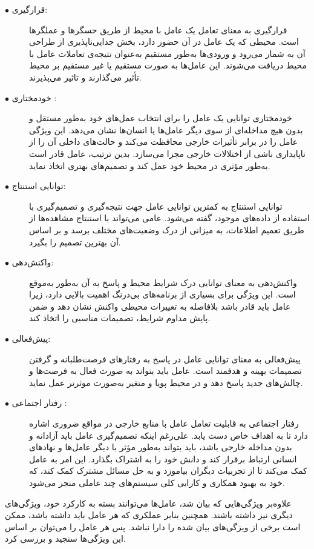 \begin{description}
	\item[$\bullet$ قرارگیری\footnotemark:] 
	قرارگیری به معنای تعامل یک عامل با محیط از طریق حسگرها و عملگرها است. محیطی که یک عامل در آن حضور دارد، بخش جدایی‌ناپذیری از طراحی آن به شمار می‌رود و ورودی‌ها به‌طور مستقیم به‌عنوان نتیجه‌ی تعاملات عامل با محیط دریافت می‌شوند. این عامل‌ها به صورت مستقیم یا غیر مستقیم بر محیط تأثیر می‌گذارند و تاثیر می‌پذیرند.
	\item[$\bullet$ خودمختاری \footnotemark:] 
	خودمختاری توانایی یک عامل را برای انتخاب عمل‌های خود به‌طور مستقل و بدون هیچ مداخله‌ای از سوی دیگر عامل‌ها یا انسان‌ها نشان می‌دهد. این ویژگی عامل را در برابر تأثیرات خارجی محافظت می‌کند و حالت‌های داخلی آن را از ناپایداری ناشی از اختلالات خارجی مجزا می‌سازد. بدین ترتیب، عامل قادر است به‌طور مؤثری در محیط خود عمل کند و تصمیم‌های بهتری اتخاذ نماید.
	\item[$\bullet$ توانایی استنتاج\footnotemark:] 
	توانایی استنتاج به کمترین توانایی عامل جهت نتیجه‌گیری و تصمیم‌گیری با استفاده از داده‌های موجود، گفته می‌شود. عامی می‌تواند با استنتاج مشاهده‌ها از طریق تعمیم اطلاعات، به میزانی از درک وضعیت‌های مختلف برسد و بر اساس آن بهترین تصمیم را بگیرد.
	\item[$\bullet$ واکنش‌دهی\footnotemark:] 
	واکنش‌دهی به معنای توانایی درک شرایط محیط و پاسخ به آن به‌طور به‌موقع است. این ویژگی برای بسیاری از برنامه‌های بی‌درنگ اهمیت بالایی دارد، زیرا عامل باید قادر باشد بلافاصله به تغییرات محیطی واکنش نشان دهد و ضمن پایش مداوم شرایط، تصمیمات مناسبی را اتخاذ کند.
	\item[$\bullet$ پیش‌فعالی\footnotemark:] 
	
	پیش‌فعالی به معنای توانایی عامل در پاسخ به رفتارهای فرصت‌طلبانه و گرفتن تصمیمات بهینه و هدفمند است. عامل باید بتواند به صورت فعال به فرصت‌ها و چالش‌های جدید پاسخ دهد و در محیط پویا و متغیر به‌صورت موثرتر عمل نماید.
	\item[$\bullet$ رفتار اجتماعی \footnotemark:] 
	رفتار اجتماعی به قابلیت تعامل عامل با منابع خارجی در مواقع ضروری اشاره دارد تا به اهداف خاص دست یابد. علی‌رغم اینکه تصمیم‌گیری عامل باید آزادانه و بدون مداخله خارجی باشد، باید بتواند به‌طور مؤثر با دیگر عامل‌ها و نهادهای انسانی ارتباط برقرار کند و دانش خود را به اشتراک بگذارد. این امر به عامل کمک می‌کند تا از تجربیات دیگران بیاموزد و به حل مسائل مشترک کمک کند، که خود به بهبود همکاری و کارایی کلی سیستم‌های چند عاملی منجر می‌شود.
\end{description}
علاوه‌بر ویژگی‌هایی که بیان شد، عامل‌ها می‌توانند بسته به کارکرد خود، ویژگی‌های دیگری نیز داشته باشند. همچنین بنابر عملکری که هر عامل باید داشته باشد، ممکن است برخی از ویزگی‌های بیان شده را دارا نباشد. پس هر عامل را می‌توان بر اساس این ویژگی‌ها سنجید و بررسی کرد.





